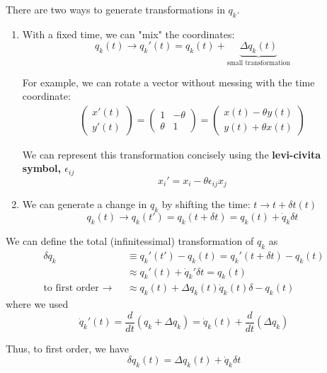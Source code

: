\documentclass[11pt]{article}
\begin{document}
\vskip 0.5cm
There are two ways to generate transformations in $q_{k}$. 
\begin{enumerate}
  \item With a fixed time, we can "mix" the coordinates:
  \[ q_{k}(t) \rightarrow q_{k}'(t) = q_{k}(t) + \underbrace{\Delta q_{k}(t) }_{\text{small transformation}} \]

  For example, we can rotate a vector without messing with the time coordinate:
  \begin{align*}
    \begin{pmatrix}
      x'(t) \\
      y'(t)
    \end{pmatrix} = \begin{pmatrix}
      1 & -\theta \\
      \theta & 1
    \end{pmatrix} = \begin{pmatrix}
      x(t) - \theta y(t) \\
      y(t) + \theta x(t) 
    \end{pmatrix}
  \end{align*}

  We can represent this transformation concisely using the \textbf{levi-civita symbol, $\epsilon_{ij}$}
  \[ \boxed{x_i' = x_i - \theta \epsilon_{ij}x_j } \]

  \vskip 0.5cm
  \item We can generate a change in $q_{k}$ by shifting the time: $t \rightarrow t + \delta t(t)$
  \[ q_{k}(t) \rightarrow q_{k}(t') = q_{k}(t + \delta t) = q_{k}(t) + \dot{q}_{k} \delta t \]
\end{enumerate}

\vskip 0.5cm
We can define the total (infinitessimal) transformation of $q_{k}$ as 
\begin{align*}
  \delta q_{k} &\equiv q_{k}'(t') - q_{k}(t) = q_{k}'(t + \delta t) - q_{k}(t) \\
  &\approx q_{k}'(t) + \dot{q}_{k}' \delta t = q_{k}(t) \\
  \text{to first order $\rightarrow$  } &\approx q_{k}(t) + \Delta q_{k}(t)\dot{q}_{k}(t) \delta - q_{k}(t)
\end{align*}
where we used 
\[ \dot{q}_{k}'(t) = \frac{d}{dt} \left( q_{k} + \Delta q_{k} \right) = \dot{q}_{k}(t) + \frac{d}{dt} \left(\Delta q_{k}\right) \]

\vskip 0.5cm
Thus, to first order, we have 
\[ \boxed{\delta q_{k}(t) = \Delta q_{k}(t) + \dot{q}_{k} \delta t} \]
\end{document}
